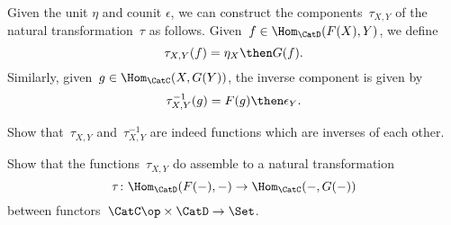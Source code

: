 Given the unit $\eta$ and counit $\epsilon$, we can construct the components~$\tau_{X,Y}$ of the natural transformation~$\tau$ as follows. Given~$f \in \Hom_{\CatD}(F(X),Y)$, we define
\begin{equation*}
  \tau_{X,Y}(f) = \eta_X \then G(f).
\end{equation*}
Similarly, given~$g \in \Hom_{\CatC}(X,G(Y))$, the inverse component is given by
\begin{equation*}
  \tau_{X,Y}^{-1}(g) = F(g) \then \epsilon_Y.
\end{equation*}

\begin{exercise}
  Show that~$\tau_{X,Y}$ and~$\tau_{X,Y}^{-1}$ are indeed functions which are inverses of each other.
\end{exercise}

\begin{exercise}
  Show that the functions~$\tau_{X,Y}$ do assemble to a natural transformation
  \begin{equation*}
    \tau  \colon \Hom_{\CatD}(F(-) ,- ) \to \Hom_{\CatC}(-  , G(- ) )
  \end{equation*}
  between functors~$\CatC\op \times \CatD \to \Set $.
\end{exercise}
